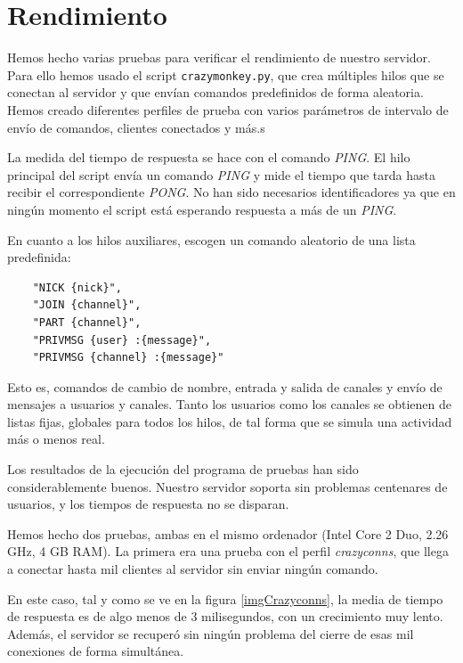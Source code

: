 \documentclass{article}
\begin{document}
\section{Rendimiento}

Hemos hecho varias pruebas para verificar el rendimiento de nuestro servidor. Para ello hemos usado el script \texttt{crazymonkey.py}, que crea múltiples hilos que se conectan al servidor y que envían comandos predefinidos de forma aleatoria. Hemos creado diferentes perfiles de prueba con varios parámetros de intervalo de envío de comandos, clientes conectados y más.s

La medida del tiempo de respuesta se hace con el comando \textit{PING}. El hilo principal del script envía un comando \textit{PING} y mide el tiempo que tarda hasta recibir el correspondiente \textit{PONG}. No han sido necesarios identificadores ya que en ningún momento el script está esperando respuesta a más de un \textit{PING}.

En cuanto a los hilos auxiliares, escogen un comando aleatorio de una lista predefinida:

\begin{verbatim}
	"NICK {nick}",
	"JOIN {channel}",
	"PART {channel}",
	"PRIVMSG {user} :{message}",
	"PRIVMSG {channel} :{message}"
\end{verbatim}

Esto es, comandos de cambio de nombre, entrada y salida de canales y envío de mensajes a usuarios y canales. Tanto los usuarios como los canales se obtienen de listas fijas, globales para todos los hilos, de tal forma que se simula una actividad más o menos real.

Los resultados de la ejecución del programa de pruebas han sido considerablemente buenos. Nuestro servidor soporta sin problemas centenares de usuarios, y los tiempos de respuesta no se disparan. 

Hemos hecho dos pruebas, ambas en el mismo ordenador (Intel Core 2 Duo, 2.26 GHz, 4 GB RAM). La primera era una prueba con el perfil \textit{crazyconns}, que llega a conectar hasta mil clientes al servidor sin enviar ningún comando. 

En este caso, tal y como se ve en la figura \ref{imgCrazyconns}, la media de tiempo de respuesta es de algo menos de 3 milisegundos, con un crecimiento muy lento. Además, el servidor se recuperó sin ningún problema del cierre de esas mil conexiones de forma simultánea.
\end{document}
